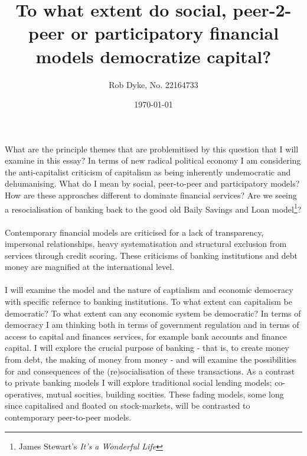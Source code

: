 \documentclass{article}
\title{To what extent do social, peer-2-peer or participatory financial models democratize capital?}
\author{Rob Dyke, No. 22164733}
\date{\today}
\begin{document}
\begin{doublespacing}

\maketitle

\paragraph{}What are the principle themes that are problemitised by this question that I will examine in this essay? In terms of new radical political economy I am considering the anti-capitalist criticism of capitalism as being inherently undemocratic and dehumanising. What do I mean by social, peer-to-peer and participatory models? How are these approaches different to dominate financial services? Are we seeing a resocialisation of banking back to the good old Baily Savings and Loan model\footnote{James Stewart's \emph{It's a Wonderful Life}}?

\paragraph{}Contemporary financial models are criticised for a lack of transparency, impersonal relationships, heavy systematisation and structural exclusion from services through credit scoring. These criticisms of banking institutions and debt money are magnified at the international level.

\paragraph{}I will examine the model and the nature of captialism and economic democracy with specific refernce to banking institutions. To what extent can capitalism be democratic? To what extent can any economic system be democratic? In terms of democracy I am thinking both in terms of government regulation and in terms of access to capital and finances services, for example bank accounts and finance capital. I will explore the crucial purpose of banking - that is, to create money from debt, the making of money from money - and will examine the possibilities for and consequences of the (re)socialisation of these transactions. As a contrast to private banking models I will explore traditional social lending models; co-operatives, mutual socities, building socities. These fading models, some long since capitalised and floated on stock-markets, will be contrasted to contemporary peer-to-peer models.


\end{doublespacing}
\end{document}
